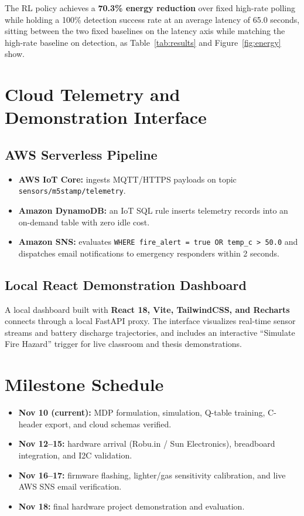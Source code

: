 \documentclass[10pt,twocolumn]{article}
\begin{document}
The RL policy achieves a \textbf{70.3\% energy reduction} over fixed high-rate polling while holding a 100\% detection success rate at an average latency of 65.0 seconds, sitting between the two fixed baselines on the latency axis while matching the high-rate baseline on detection, as Table~\ref{tab:results} and Figure~\ref{fig:energy} show.

\section{Cloud Telemetry and Demonstration Interface}

\subsection{AWS Serverless Pipeline}
\begin{itemize}[leftmargin=1.4em]
    \item \textbf{AWS IoT Core:} ingests MQTT/HTTPS payloads on topic \texttt{sensors/m5stamp/telemetry}.
    \item \textbf{Amazon DynamoDB:} an IoT SQL rule inserts telemetry records into an on-demand table with zero idle cost.
    \item \textbf{Amazon SNS:} evaluates \texttt{WHERE fire\_alert = true OR temp\_c > 50.0} and dispatches email notifications to emergency responders within 2 seconds.
\end{itemize}

\subsection{Local React Demonstration Dashboard}
A local dashboard built with \textbf{React 18, Vite, TailwindCSS, and Recharts} connects through a local FastAPI proxy. The interface visualizes real-time sensor streams and battery discharge trajectories, and includes an interactive ``Simulate Fire Hazard'' trigger for live classroom and thesis demonstrations.

\section{Milestone Schedule}
\begin{itemize}[leftmargin=1.4em]
    \item \textbf{\textcolor{circuitbluedark}{Nov 10 (current):}} MDP formulation, simulation, Q-table training, C-header export, and cloud schemas verified.
    \item \textbf{\textcolor{circuitbluedark}{Nov 12--15:}} hardware arrival (Robu.in / Sun Electronics), breadboard integration, and I2C validation.
    \item \textbf{\textcolor{circuitbluedark}{Nov 16--17:}} firmware flashing, lighter/gas sensitivity calibration, and live AWS SNS email verification.
    \item \textbf{\textcolor{flameorange}{Nov 18:}} final hardware project demonstration and evaluation.
\end{itemize}
\end{document}
